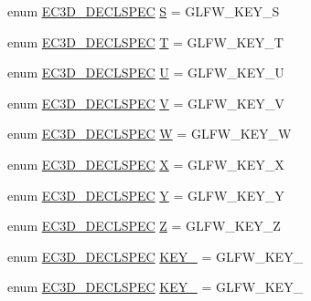 \begin{DoxyCompactItemize}
\item 
enum \mbox{\hyperlink{_common_8h_aac42573e202ca3dd4d259c81691e2369}{E\+C3\+D\+\_\+\+D\+E\+C\+L\+S\+P\+EC}} \mbox{\hyperlink{classec_1_1_keyboard_ab11aae5fb83407687e9f8acdfa163910}{S}} = G\+L\+F\+W\+\_\+\+K\+E\+Y\+\_\+S
\item 
enum \mbox{\hyperlink{_common_8h_aac42573e202ca3dd4d259c81691e2369}{E\+C3\+D\+\_\+\+D\+E\+C\+L\+S\+P\+EC}} \mbox{\hyperlink{classec_1_1_keyboard_a09f863373edf51f09e94316f13dad263}{T}} = G\+L\+F\+W\+\_\+\+K\+E\+Y\+\_\+T
\item 
enum \mbox{\hyperlink{_common_8h_aac42573e202ca3dd4d259c81691e2369}{E\+C3\+D\+\_\+\+D\+E\+C\+L\+S\+P\+EC}} \mbox{\hyperlink{classec_1_1_keyboard_a766e2c870a29b0e0cfdf87346126f9aa}{U}} = G\+L\+F\+W\+\_\+\+K\+E\+Y\+\_\+U
\item 
enum \mbox{\hyperlink{_common_8h_aac42573e202ca3dd4d259c81691e2369}{E\+C3\+D\+\_\+\+D\+E\+C\+L\+S\+P\+EC}} \mbox{\hyperlink{classec_1_1_keyboard_a9b00b29bff502c4e5409b088da7270de}{V}} = G\+L\+F\+W\+\_\+\+K\+E\+Y\+\_\+V
\item 
enum \mbox{\hyperlink{_common_8h_aac42573e202ca3dd4d259c81691e2369}{E\+C3\+D\+\_\+\+D\+E\+C\+L\+S\+P\+EC}} \mbox{\hyperlink{classec_1_1_keyboard_a6b7df6b9d699a9cab8c1283623a12333}{W}} = G\+L\+F\+W\+\_\+\+K\+E\+Y\+\_\+W
\item 
enum \mbox{\hyperlink{_common_8h_aac42573e202ca3dd4d259c81691e2369}{E\+C3\+D\+\_\+\+D\+E\+C\+L\+S\+P\+EC}} \mbox{\hyperlink{classec_1_1_keyboard_a46a9272c629195e29395f7e8d22e7cf5}{X}} = G\+L\+F\+W\+\_\+\+K\+E\+Y\+\_\+X
\item 
enum \mbox{\hyperlink{_common_8h_aac42573e202ca3dd4d259c81691e2369}{E\+C3\+D\+\_\+\+D\+E\+C\+L\+S\+P\+EC}} \mbox{\hyperlink{classec_1_1_keyboard_a3e6065997f9693286591e1300769e13a}{Y}} = G\+L\+F\+W\+\_\+\+K\+E\+Y\+\_\+Y
\item 
enum \mbox{\hyperlink{_common_8h_aac42573e202ca3dd4d259c81691e2369}{E\+C3\+D\+\_\+\+D\+E\+C\+L\+S\+P\+EC}} \mbox{\hyperlink{classec_1_1_keyboard_a342c1ef739e9fd209135017e48f25c58}{Z}} = G\+L\+F\+W\+\_\+\+K\+E\+Y\+\_\+Z
\item 
enum \mbox{\hyperlink{_common_8h_aac42573e202ca3dd4d259c81691e2369}{E\+C3\+D\+\_\+\+D\+E\+C\+L\+S\+P\+EC}} \mbox{\hyperlink{classec_1_1_keyboard_a26913e78a3604aad7a6b33b5d3ba6ad8}{K\+E\+Y\+\_}} = G\+L\+F\+W\+\_\+\+K\+E\+Y\+\_
\item 
enum \mbox{\hyperlink{_common_8h_aac42573e202ca3dd4d259c81691e2369}{E\+C3\+D\+\_\+\+D\+E\+C\+L\+S\+P\+EC}} \mbox{\hyperlink{classec_1_1_keyboard_a0dba45a69958022d4dc07328e803f3e7}{K\+E\+Y\+\_}} = G\+L\+F\+W\+\_\+\+K\+E\+Y\+\_

\end{DoxyCompactItemize}
